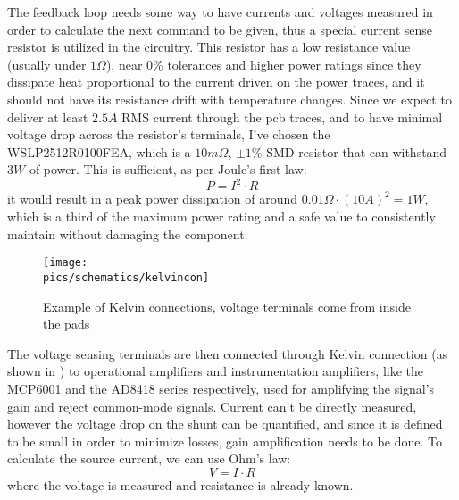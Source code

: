 The feedback loop needs some way to have currents and voltages measured in order to calculate the next command to be given, thus a special current sense resistor is utilized in the circuitry.
This resistor has a low resistance value (usually under $1\Omega$), near 0\% tolerances and higher power ratings since they dissipate heat proportional to the current driven on the power traces, and it should not have its resistance drift with temperature changes.
Since we expect to deliver at least $2.5A$ RMS current through the \gls{pcb} traces, and to have minimal voltage drop across the resistor's terminals, I've chosen the WSLP2512R0100FEA, which is a $10m\Omega$, $\pm 1\%$ SMD resistor that can withstand $3W$ of power.
This is sufficient, as per Joule's first law:
\begin{equation}
    \label{eq:Joulefirstlaw}
    P = I^2 \cdot R
\end{equation}
it would result in a peak power dissipation of around $0.01\Omega \cdot (10A)^2 = 1W$, which is a third of the maximum power rating and a safe value to consistently maintain without damaging the component\cite{scherz2006practical}.

\begin{figure}[!ht]
    \begin{center}\texttt{[image: \\pics/schematics/kelvincon]}\end{center}
    \caption{Example of Kelvin connections, voltage terminals come from inside the pads}
    \label{fig:kelvin}
\end{figure}

The voltage sensing terminals are then connected through \gls{Kelvin connection} (as shown in ) to operational amplifiers and instrumentation amplifiers, like the MCP6001 and the AD8418 series respectively, used for amplifying the signal's gain and reject common-mode signals.
Current can't be directly measured, however the voltage drop on the shunt can be quantified, and since it is defined to be small in order to minimize losses, gain amplification needs to be done\cite{scherz2006practical}.
To calculate the source current, we can use Ohm's law:
\begin{equation}
    \label{eq:Ohmslaw}
    V = I \cdot R
\end{equation}
where the voltage is measured and resistance is already known.


